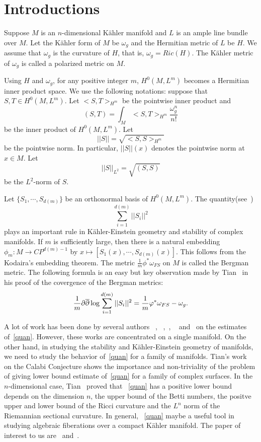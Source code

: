 \section{Introductions}

Suppose $M$ is an $n$-dimensional K\"ahler manifold and $L$ is an ample
line bundle over $M$. Let the K\"ahler form of $M$ be $\omega_g$ and the
Hermitian metric of $L$ be $H$. We assume that $\omega_g$ is the curvature
of $H$, that is, $\omega_g=Ric(H)$. 
The K\"ahler metric of
$\omega_g$ is called a polarized 
\ka metric on $M$.

Using $H$ and $\omega_g$,
for any positive integer $m$,
 $H^0(M,L^m)$ becomes a Hermitian inner product space. 
We use the following notations: suppose that $S,T\in H^0(M,L^m)$. Let
$<S,T>_{H^m}$ be the pointwise inner product and
\[
(S,T)=\int_M<S,T>_{H^m}\frac{\omega^n_g}{n!}
\]
be the inner product of $H^0(M,L^m)$. Let
\[
||S||=\sqrt{<S,S>_{H^m}
}
\]
be the pointwise norm. In particular, $||S||(x)$ denotes the pointwise
norm at $x\in M$. Let
\[
||S||_{L^2}=\sqrt{(S,S)}
\]
be the $L^2$-norm of $S$. 

Let $\{S_1,\cdots,S_{d(m)}\}$ be an orthonormal basis of $H^0(M,L^m)$.
The quantity(see~\cite{T5})
\begin{equation}\label{quan}
\sum_{i=1}^{d(m)}||S_i||^2
\end{equation}
plays an important rule in K\"ahler-Einstein geometry and stability of
complex manifolds. 
If $m$ is sufficiently large, then there is a natural embedding
$\phi_m: M\rightarrow CP^{d(m)-1}$ by
$x\mapsto [S_1(x),\cdots,S_{d(m)}(x)]$. 
This follows from the Kodaira's embedding theorem.
The metric
$\frac 1m\phi^*\omega_{FS}$ on $M$ is called the Bergman metric. 
The following formula is an easy but key observation made by
Tian~\cite{T5}
in his proof of the covergence of the Bergman metrics:
\[
\frac 1m\partial\overline{\partial}\log\sum_{i=1}^{d(m)}||S_i||^2=\frac 1m
\varphi^*\omega_{FS}-\omega_g.
\]


A lot of work has been done by several authors 
~\cite{T5},
~\cite{ru},~\cite{sz}, ~\cite{cat} and~\cite{Lu10}
on the estimates
of~\eqref{quan}. However, these works are concentrated on a
single manifold. On the other hand, in studying the stability and
K\"ahler-Einstein
geometry
of  manifolds, we need to study the behavior of~\eqref{quan} for
a
family of manifolds. Tian's work~\cite{T6} on the Calabi Conjecture shows
the
importance and non-triviality of the problem of giving lower bound
estimate 
of~\eqref{quan}
for a family of complex surfaces. 
In the  $n$-dimensional case, Tian~\cite{T9} proved that
~\eqref{quan} has
a positive lower bound depends on the
dimension $n$, the upper bound of the Betti numbers, the positve upper and
lower bound of the Ricci curvature and the $L^n$ norm of the Riemannian
sectional curvature.
In general, 
~\eqref{quan}  maybe a useful tool in studying algebraic fiberations over
a compact K\"ahler manifold.
The paper of interest to us are~\cite{MR83h:14025}
and~\cite{MR86j:14032}.


